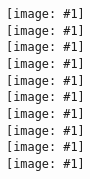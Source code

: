 \documentclass[english, 12 pt]{report}
\newcommand{\fig}[1]{
		\centering
	\texttt{[image: \#1]} \\[60pt]
}
\begin{document}
\pagestyle{empty}
\fig{fig1}
\fig{fig2}
\fig{fig3}
\fig{fig4}
\fig{fig5}
\fig{fig6}
\fig{fig7}
\fig{fig8}
\fig{fig9}
\fig{fig10}
\end{document}

